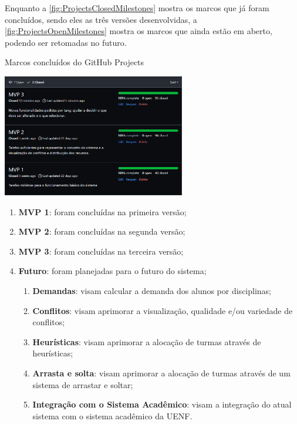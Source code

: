 Enquanto a \autoref{fig:ProjectsClosedMilestones} mostra os marcos que já foram concluídos, sendo eles as três versões desenvolvidas, a \autoref{fig:ProjectsOpenMilestones} mostra os marcos que ainda estão em aberto, podendo ser retomadas no futuro.

\begin{MyCenteredFigure} \caption{Marcos concluídos do GitHub Projects} \label{fig:ProjectsClosedMilestones}
  \includegraphics[width=0.6\textwidth]{files/img/2.02!5-desenvolvimento/2.02!5.1.4-sistema/GitHub Projects/GitHubProjects-Closed_Milestones}
\end{MyCenteredFigure}

\begin{enumerate}
  \item \textbf{MVP 1}: foram concluídas na primeira versão;
  \item \textbf{MVP 2}: foram concluídas na segunda versão;
  \item \textbf{MVP 3}: foram concluídas na terceira versão;
  \item \textbf{Futuro}: foram planejadas para o futuro do sistema;
        \begin{enumerate}
          \item \textbf{Demandas}: visam calcular a demanda dos alunos por disciplinas;
          \item \textbf{Conflitos}: visam aprimorar a visualização, qualidade e/ou variedade de conflitos;
          \item \textbf{Heurísticas}: visam aprimorar a alocação de turmas através de heurísticas;
          \item \textbf{Arrasta e solta}: visam aprimorar a alocação de turmas através de um sistema de arrastar e soltar;
          \item \textbf{Integração com o Sistema Acadêmico}: visam a integração do atual sistema com o sistema acadêmico da UENF.
        \end{enumerate}
\end{enumerate}

